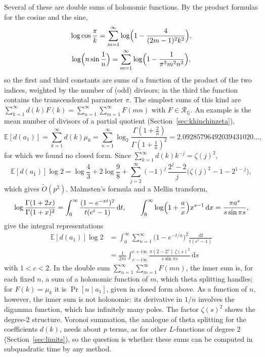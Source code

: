 \documentclass[11pt,reqno]{amsart}
\theoremstyle{definition}
\theoremstyle{remark}
\newcommand{\dd}{\,\mathrm{d}}
\newcommand{\Qbar}{\overline{\mathbb{Q}}}
\newcommand{\RegQ}{\mathcal{R}_{\Qbar}}
\begin{document}
Several of these are double sums of holonomic functions. By the product formulas for the cosine and the sine,
\begin{gather*}
  \log\cos\frac\pi k = \sum_{m=1}^{\infty}\log\Bigl(1 - \frac{4}{(2m-1)^2k^2}\Bigr), \\
  \log\Bigl(n\sin\frac1n\Bigr) = \sum_{m=1}^{\infty}\log\Bigl(1 - \frac{1}{\pi^2m^2n^2}\Bigr),
\end{gather*}
so the first and third constants are sums of a function of the product of the two indices, weighted by the number of
(odd) divisors; in the third the function contains the transcendental parameter $\pi$. The simplest sums of this kind
are $\sum_{k=1}^{\infty}d(k)F(k) = \sum_{n=1}^{\infty}\sum_{m=1}^{\infty}F(mn)$ with $F \in \RegQ$. An example is the
mean number of divisors of a partial quotient (Section~\ref{sec:khinchinzeta}),
\[
  \mathbb E[d(a_1)] = \sum_{k=1}^{\infty}d(k)\mu_k
  = \sum_{n=1}^{\infty}\log_2\frac{\Gamma(1+\frac2n)}{\Gamma(1+\frac1n)^2} = 2.09285796492039431020\ldots,
\]
for which we found no closed form. Since $\sum_{k=1}^{\infty}d(k)k^{-j} = \zeta(j)^2$,
\[
  \mathbb E[d(a_1)]\log2 = \log\frac43 + 2\log\frac98
  + \sum_{j=2}^{\infty}(-1)^j\,\frac{2^j-2}{j}\bigl(\zeta(j)^2 - 1 - 2^{1-j}\bigr),
\]
which gives $\widetilde O(p^2)$. Malmsten's formula and a Mellin transform,
\[
  \log\frac{\Gamma(1+2x)}{\Gamma(1+x)^2} = \int_0^\infty\frac{(1-e^{-xt})^2}{t(e^t-1)}\dd t, \qquad
  \int_0^\infty\log\Bigl(1+\frac ax\Bigr)x^{s-1}\dd x = \frac{\pi a^s}{s\sin\pi s},
\]
give the integral representations
\begin{align*}
  \mathbb E[d(a_1)]\log2 &= \int_0^\infty\sum_{n=1}^{\infty}\bigl(1-e^{-t/n}\bigr)^2\frac{\dd t}{t(e^t-1)} \\
  &= \frac1{2\pi i}\int_{c-i\infty}^{c+i\infty}\frac{\pi(2-2^s)\,\zeta(s)^2}{s\sin\pi s}\dd s
\end{align*}
with $1 < c < 2$. In the double sum $\sum_{n=1}^{\infty}\sum_{m=1}^{\infty}F(mn)$, the inner sum is, for each fixed
$n$, a sum of a holonomic function of $m$, which theta splitting handles; for $F(k) = \mu_k$ it is
$\Pr[n \mid a_1]$, given in closed form above. As a function of $n$, however, the inner sum is not holonomic: its
derivative in $1/n$ involves the digamma function, which has infinitely many poles. The factor $\zeta(s)^2$ shows the
degree-$2$ structure. Voronoi summation, the analogue of theta splitting for the coefficients $d(k)$, needs about $p$
terms, as for other $L$-functions of degree $2$ (Section~\ref{sec:limits}), so the question is whether these sums can
be computed in subquadratic time by any method.
\end{document}
